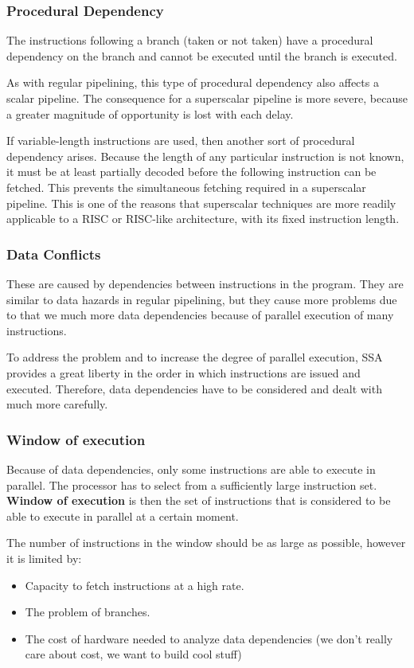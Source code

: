 \subsubsection{Procedural Dependency}
The instructions following a branch (taken or not taken) have a procedural dependency on the branch and cannot be executed until the branch is executed.

As with regular pipelining, this type of procedural dependency also affects a scalar pipeline. The consequence for a superscalar pipeline is more severe, because a greater magnitude of opportunity is lost with each delay.

If variable-length instructions are used, then another sort of procedural dependency arises. Because the length of any particular instruction is not known, it must be at least partially decoded before the following instruction can be fetched. This prevents the simultaneous fetching required in a superscalar pipeline. This is one of the reasons that superscalar techniques are more readily applicable to a RISC or RISC-like architecture, with its fixed instruction length.

\subsubsection{Data Conflicts}
These are caused by dependencies between instructions in the program. They are similar to data hazards in regular pipelining, but they cause more problems due to that we much more data dependencies because of parallel execution of many instructions.

To address the problem and to increase the degree of parallel execution, SSA provides a great liberty in the order in which instructions are issued and executed. Therefore, data dependencies have to be considered and dealt with much more carefully.
\subsubsection{Window of execution}
Because of data dependencies, only some instructions are able to execute in parallel. The processor has to select from a sufficiently large instruction set. \textbf{Window of execution} is then the set of instructions that is considered to be able to execute in parallel at a certain moment.

The number of instructions in the window should be as large as possible, however it is limited by: \\
\begin{itemize}
\item Capacity to fetch instructions at a high rate.
\item The problem of branches.
\item The cost of hardware needed to analyze data dependencies (we don't really care about cost, we want to build cool stuff)
\end{itemize}

